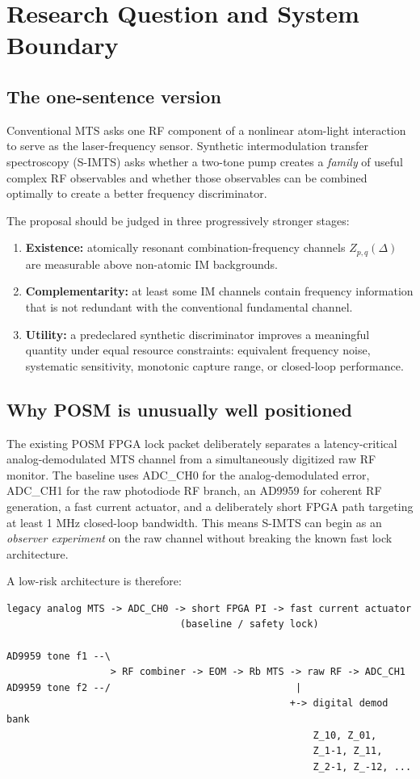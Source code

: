 \documentclass[10pt]{article}
\begin{document}
\newpage
\tableofcontents
\newpage

\section{Research Question and System Boundary}

\subsection{The one-sentence version}
Conventional MTS asks one RF component of a nonlinear atom-light interaction to serve as the laser-frequency sensor. Synthetic intermodulation transfer spectroscopy (S-IMTS) asks whether a two-tone pump creates a \emph{family} of useful complex RF observables and whether those observables can be combined optimally to create a better frequency discriminator.

The proposal should be judged in three progressively stronger stages:
\begin{enumerate}
\item \textbf{Existence:} atomically resonant combination-frequency channels $Z_{p,q}(\Delta)$ are measurable above non-atomic IM backgrounds.
\item \textbf{Complementarity:} at least some IM channels contain frequency information that is not redundant with the conventional fundamental channel.
\item \textbf{Utility:} a predeclared synthetic discriminator improves a meaningful quantity under equal resource constraints: equivalent frequency noise, systematic sensitivity, monotonic capture range, or closed-loop performance.
\end{enumerate}

\subsection{Why POSM is unusually well positioned}
The existing POSM FPGA lock packet deliberately separates a latency-critical analog-demodulated MTS channel from a simultaneously digitized raw RF monitor. The baseline uses ADC\_CH0 for the analog-demodulated error, ADC\_CH1 for the raw photodiode RF branch, an AD9959 for coherent RF generation, a fast current actuator, and a deliberately short FPGA path targeting at least 1 MHz closed-loop bandwidth. This means S-IMTS can begin as an \emph{observer experiment} on the raw channel without breaking the known fast lock architecture.

A low-risk architecture is therefore:
\begin{verbatim}
legacy analog MTS -> ADC_CH0 -> short FPGA PI -> fast current actuator
                              (baseline / safety lock)

AD9959 tone f1 --\
                  > RF combiner -> EOM -> Rb MTS -> raw RF -> ADC_CH1
AD9959 tone f2 --/                                |
                                                 +-> digital demod bank
                                                     Z_10, Z_01,
                                                     Z_1-1, Z_11,
                                                     Z_2-1, Z_-12, ...
\end{verbatim}
\end{document}
